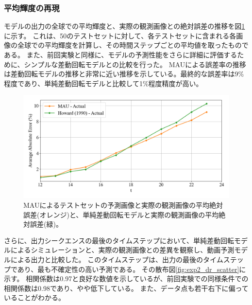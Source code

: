       \subsubsection{平均輝度の再現}
        モデルの出力の全球での平均輝度と、実際の観測画像との絶対誤差の推移を図\ref{fig:exp2_error}に示す。
        これは、50のテストセットに対して、各テストセットに含まれる各画像の全球での平均輝度を計算し、その時間ステップごとの平均値を取ったものである。
        また、前回実験と同様に、モデルの予測性能をさらに詳細に評価するために、シンプルな差動回転モデルとの比較を行った。
        MAUによる誤差率の推移は差動回転モデルの推移と非常に近い推移を示している。最終的な誤差率は9\%程度であり、単純差動回転モデルと比較して1\%程度精度が高い。
        \begin{figure}[htbp]
          \centering
          \includegraphics[width=\textwidth]{figures/exp2/error_dr.png}
          \caption{MAUによるテストセットの予測画像と実際の観測画像の平均絶対誤差(オレンジ)と、単純差動回転モデルと実際の観測画像の平均絶対誤差(緑)。}
          \label{fig:exp2_error}
        \end{figure}
        さらに、出力シークエンスの最後のタイムステップにおいて、単純差動回転モデルによるシミュレーションと、実際の観測画像との差異を観察し、動画予測モデルによる出力と比較した。
        このタイムステップは、出力の最後のタイムステップであり、最も不確定性の高い予測である。
        その散布図\ref{fig:exp2_dr_scatter}に示す。
        相関係数は0.97と良好な数値を示しているが、前回実験での同様条件での相関係数は0.98であり、やや低下している。
        また、データ点も若干右下に偏っていることがわかる。
